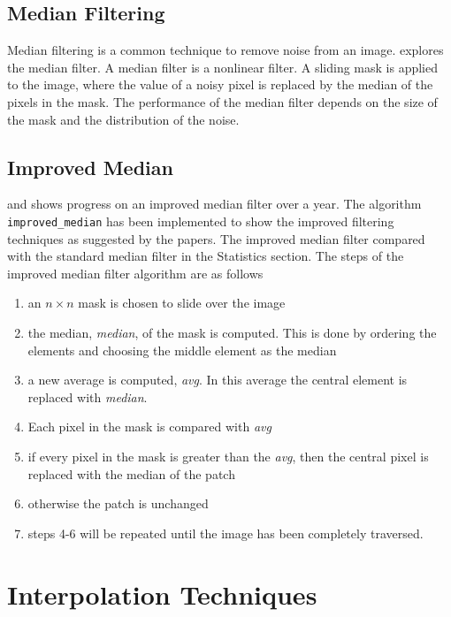 \documentclass{article}
\begin{document}
\subsection{Median Filtering}
%
\begin{flushleft}
  Median filtering is a common technique to remove noise from an
  image. \cite{Med2012} explores the median filter. A median filter is a
  nonlinear filter. A sliding mask is applied to the image, where the
  value of a noisy pixel is replaced by the median of the pixels in
  the mask. The performance of the median filter depends on the size
  of the mask and the distribution of the noise.

  \subsection{Improved Median}
   \cite{improved-median} and \cite{Med2012} shows progress on an
   improved median filter over a year. The algorithm
   \texttt{improved\_median} has been implemented to show the improved
   filtering techniques as suggested by the papers. The improved
   median filter compared with
   the standard median filter in the Statistics section. The steps of
   the improved median filter algorithm are as
   follows
   \begin{enumerate}
   \item an $n\times n$ mask is chosen to slide over the image
     \item the median, \textit{median}, of the mask is computed. This
       is done by ordering the elements and choosing the middle
       element as the median
       \item a new average is computed, \textit{avg}. In this average the
         central element is replaced with \textit{median}.
         \item Each pixel in the mask is compared with
           \textit{avg}
           \item if every pixel in the mask is greater than the
             \textit{avg}, then the central pixel is replaced with the
             median of the patch
           \item otherwise the patch is unchanged
             \item steps 4-6 will be repeated until the image has been
               completely traversed.
     \end{enumerate}
   
  \end{flushleft}
%
  \section{Interpolation Techniques}
  
\end{document}
